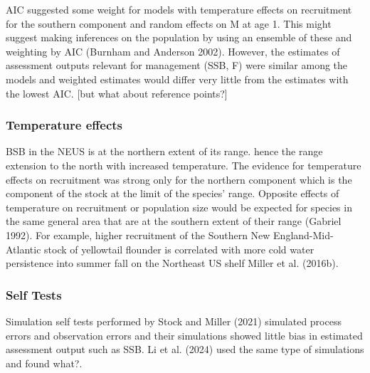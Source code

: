 \documentclass[
]{article}
\begin{document}
AIC suggested some weight for models with temperature effects on
recruitment for the southern component and random effects on M at age 1.
This might suggest making inferences on the population by using an
ensemble of these and weighting by AIC (Burnham and Anderson 2002).
However, the estimates of assessment outputs relevant for management
(SSB, F) were similar among the models and weighted estimates would
differ very little from the estimates with the lowest AIC. {[}but what
about reference points?{]}

\hypertarget{temperature-effects}{%
\subsubsection*{Temperature effects}\label{temperature-effects}}

BSB in the NEUS is at the northern extent of its range. hence the range
extension to the north with increased temperature. The evidence for
temperature effects on recruitment was strong only for the northern
component which is the component of the stock at the limit of the
species' range. Opposite effects of temperature on recruitment or
population size would be expected for species in the same general area
that are at the southern extent of their range (Gabriel 1992). For
example, higher recruitment of the Southern New England-Mid-Atlantic
stock of yellowtail flounder is correlated with more cold water
persistence into summer fall on the Northeast US shelf Miller et al.
(2016b).

\hypertarget{self-tests}{%
\subsubsection*{Self Tests}\label{self-tests}}

Simulation self tests performed by Stock and Miller (2021) simulated
process errors and observation errors and their simulations showed
little bias in estimated assessment output such as SSB. Li et al. (2024)
used the same type of simulations and found what?.
\end{document}

